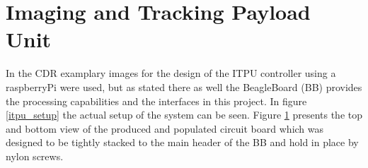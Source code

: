  
\section{Imaging and Tracking Payload Unit}
\label{sec:changes_itpu}

In the CDR examplary images for the design of the ITPU controller using a raspberryPi were used, but as stated there as well the BeagleBoard (BB) provides the processing capabilities and the interfaces in this project. In figure \ref{itpu_setup} the actual setup of the system can be seen. Figure \ref{fig:itpu_pcb} presents the top and bottom view of the produced and populated circuit board which was designed to be tightly stacked to the main header of the BB and hold in place by nylon screws.

\begin{figure}
\label{fig:itpu_pcb}
\begin{centering}
\end{centering}
\end{figure}
